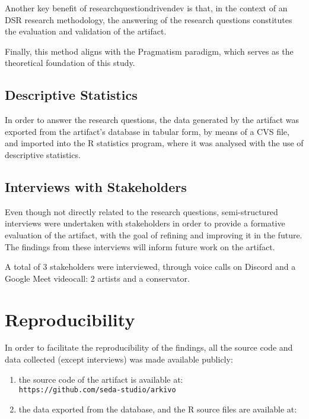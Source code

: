 Another key benefit of \gls{researchquestiondrivendev} is that, in the context of an DSR research methodology, the answering of the research questions constitutes the evaluation and validation of the artifact.

Finally, this method aligns with the Pragmatism paradigm, which serves as the theoretical foundation of this study.

\subsection{Descriptive Statistics}

In order to answer the research questions, the data generated by the artifact was exported from the artifact's database in tabular form, by means of a CVS file, and imported into the R statistics program, where it was analysed with the use of descriptive statistics.

\subsection{Interviews with Stakeholders}

Even though not directly related to the research questions, semi-structured interviews were undertaken with stakeholders in order to provide a formative evaluation of the artifact, with the goal of refining and improving it in the future. The findings from these interviews will inform future work on the artifact.

\todo
A total of 3 stakeholders were interviewed, through voice calls on Discord and a Google Meet videocall: 2 artists and a conservator.


\section{Reproducibility}

In order to facilitate the reproducibility of the findings, all the source code and data collected (except interviews) was made available publicly:

\begin{enumerate}
    \item the source code of the artifact is available at:\\ \texttt{https://github.com/seda-studio/arkivo}
    \item the data exported from the database, and the R source files are available at: \todo
\end{enumerate}

